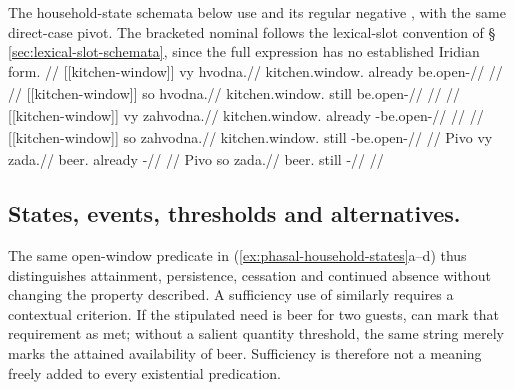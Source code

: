 The household-state schemata below use  
and its regular negative , with the same direct-case pivot.
The bracketed nominal follows the lexical-slot convention of
§\,\ref{sec:lexical-slot-schemata}, since the full expression
 has no established Iridian form.
\pex\label{ex:phasal-household-states}
\a
\begingl
\glpreamble {}//
\gla \textnormal{[[kitchen-window]]}\textsubscript{\Dir{}} vy hvodna.//
\glb kitchen.window.\Dir{} already be.open-\Cont{}//
\glft {}//
\endgl
\a
\begingl
\glpreamble {}//
\gla \textnormal{[[kitchen-window]]}\textsubscript{\Dir{}} so hvodna.//
\glb kitchen.window.\Dir{} still be.open-\Cont{}//
\glft {}//
\endgl
\a
\begingl
\glpreamble {}//
\gla \textnormal{[[kitchen-window]]}\textsubscript{\Dir{}} vy zahvodna.//
\glb kitchen.window.\Dir{} already \Neg{}-be.open-\Cont{}//
\glft {}//
\endgl
\a
\begingl
\glpreamble {}//
\gla \textnormal{[[kitchen-window]]}\textsubscript{\Dir{}} so zahvodna.//
\glb kitchen.window.\Dir{} still \Neg{}-be.open-\Cont{}//
\glft {}//
\endgl
\a
\begingl
\gla Pivo vy zada.//
\glb beer.\Dir{} already \NegExst{}-\Cont{}//
\glft {} //
\endgl
\a
\begingl
\gla Pivo so zada.//
\glb beer.\Dir{} still \NegExst{}-\Cont{}//
\glft {} //
\endgl
\xe

\subsection{States, events, thresholds and alternatives.}
The same open-window predicate in (\ref{ex:phasal-household-states}a--d)
thus distinguishes attainment, persistence, cessation and continued absence
without changing the property described. A sufficiency use of
 similarly requires a contextual criterion. If the stipulated need is
beer for two guests,  
can mark that requirement as met; without a salient quantity threshold, the
same string merely marks the attained availability of beer. Sufficiency is
therefore not a meaning freely added to every existential predication.

